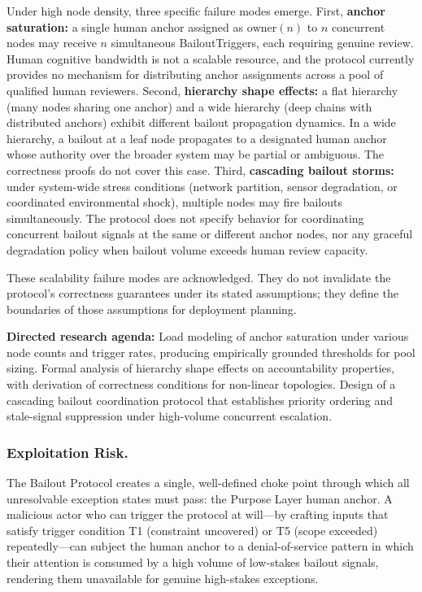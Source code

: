 Under high node density, three specific failure modes emerge. First, \textbf{anchor saturation:} a single human anchor assigned as $\text{owner}(n)$ to $n$ concurrent nodes may receive $n$ simultaneous BailoutTriggers, each requiring genuine review. Human cognitive bandwidth is not a scalable resource, and the protocol currently provides no mechanism for distributing anchor assignments across a pool of qualified human reviewers. Second, \textbf{hierarchy shape effects:} a flat hierarchy (many nodes sharing one anchor) and a wide hierarchy (deep chains with distributed anchors) exhibit different bailout propagation dynamics. In a wide hierarchy, a bailout at a leaf node propagates to a designated human anchor whose authority over the broader system may be partial or ambiguous. The correctness proofs do not cover this case. Third, \textbf{cascading bailout storms:} under system-wide stress conditions (network partition, sensor degradation, or coordinated environmental shock), multiple nodes may fire bailouts simultaneously. The protocol does not specify behavior for coordinating concurrent bailout signals at the same or different anchor nodes, nor any graceful degradation policy when bailout volume exceeds human review capacity.

These scalability failure modes are acknowledged. They do not invalidate the protocol's correctness guarantees under its stated assumptions; they define the boundaries of those assumptions for deployment planning.

\textbf{Directed research agenda:} Load modeling of anchor saturation under various node counts and trigger rates, producing empirically grounded thresholds for pool sizing. Formal analysis of hierarchy shape effects on accountability properties, with derivation of correctness conditions for non-linear topologies. Design of a cascading bailout coordination protocol that establishes priority ordering and stale-signal suppression under high-volume concurrent escalation.

\subsubsection{Exploitation Risk.}
\label{sec:exploitation-risk}

The Bailout Protocol creates a single, well-defined choke point through which all unresolvable exception states must pass: the Purpose Layer human anchor. A malicious actor who can trigger the protocol at will---by crafting inputs that satisfy trigger condition T1 (constraint uncovered) or T5 (scope exceeded) repeatedly---can subject the human anchor to a denial-of-service pattern in which their attention is consumed by a high volume of low-stakes bailout signals, rendering them unavailable for genuine high-stakes exceptions.

